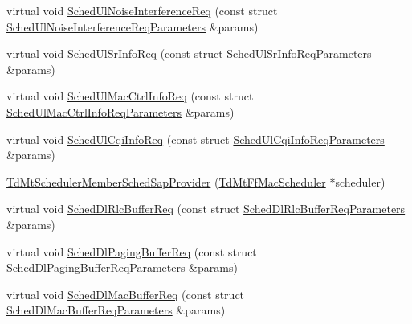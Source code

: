 \begin{DoxyCompactItemize}
\item 
virtual void \hyperlink{classns3_1_1TdMtSchedulerMemberSchedSapProvider_a9f3939128164a84401d0bc6546ad7f81}{Sched\+Ul\+Noise\+Interference\+Req} (const struct \hyperlink{structns3_1_1FfMacSchedSapProvider_1_1SchedUlNoiseInterferenceReqParameters}{Sched\+Ul\+Noise\+Interference\+Req\+Parameters} \&params)
\item 
virtual void \hyperlink{classns3_1_1TdMtSchedulerMemberSchedSapProvider_a190818dbd319621aabe69042e476e744}{Sched\+Ul\+Sr\+Info\+Req} (const struct \hyperlink{structns3_1_1FfMacSchedSapProvider_1_1SchedUlSrInfoReqParameters}{Sched\+Ul\+Sr\+Info\+Req\+Parameters} \&params)
\item 
virtual void \hyperlink{classns3_1_1TdMtSchedulerMemberSchedSapProvider_abf71dba04fca35ad5e4ba5bf592c2352}{Sched\+Ul\+Mac\+Ctrl\+Info\+Req} (const struct \hyperlink{structns3_1_1FfMacSchedSapProvider_1_1SchedUlMacCtrlInfoReqParameters}{Sched\+Ul\+Mac\+Ctrl\+Info\+Req\+Parameters} \&params)
\item 
virtual void \hyperlink{classns3_1_1TdMtSchedulerMemberSchedSapProvider_a5fc85c3f86e2f41ed0556ad3fc5835f6}{Sched\+Ul\+Cqi\+Info\+Req} (const struct \hyperlink{structns3_1_1FfMacSchedSapProvider_1_1SchedUlCqiInfoReqParameters}{Sched\+Ul\+Cqi\+Info\+Req\+Parameters} \&params)
\item 
\hyperlink{classns3_1_1TdMtSchedulerMemberSchedSapProvider_aa797edb97b5361dde66538a425e2ad2f}{Td\+Mt\+Scheduler\+Member\+Sched\+Sap\+Provider} (\hyperlink{classns3_1_1TdMtFfMacScheduler}{Td\+Mt\+Ff\+Mac\+Scheduler} $\ast$scheduler)
\item 
virtual void \hyperlink{classns3_1_1TdMtSchedulerMemberSchedSapProvider_ad2451e645a8a550494d4769494acecc6}{Sched\+Dl\+Rlc\+Buffer\+Req} (const struct \hyperlink{structns3_1_1FfMacSchedSapProvider_1_1SchedDlRlcBufferReqParameters}{Sched\+Dl\+Rlc\+Buffer\+Req\+Parameters} \&params)
\item 
virtual void \hyperlink{classns3_1_1TdMtSchedulerMemberSchedSapProvider_ad542dcc87442e2b4087ad863af209316}{Sched\+Dl\+Paging\+Buffer\+Req} (const struct \hyperlink{structns3_1_1FfMacSchedSapProvider_1_1SchedDlPagingBufferReqParameters}{Sched\+Dl\+Paging\+Buffer\+Req\+Parameters} \&params)
\item 
virtual void \hyperlink{classns3_1_1TdMtSchedulerMemberSchedSapProvider_a8334fef3db086ab7aebb84c3eada0325}{Sched\+Dl\+Mac\+Buffer\+Req} (const struct \hyperlink{structns3_1_1FfMacSchedSapProvider_1_1SchedDlMacBufferReqParameters}{Sched\+Dl\+Mac\+Buffer\+Req\+Parameters} \&params)

\end{DoxyCompactItemize}

